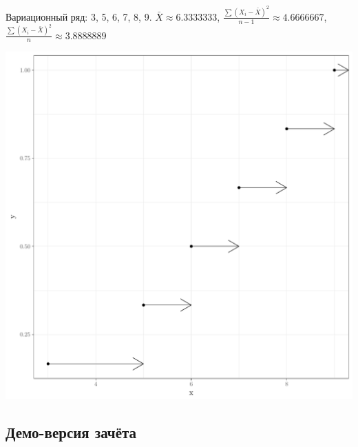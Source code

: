\documentclass[12pt, a4paper]{article}\usepackage[]{graphicx}\usepackage[]{color}
\begin{document}
\begin{enumerate}
Вариационный ряд: 3, 5, 6, 7, 8, 9. $\bar{X}\approx 6.3333333$,
$\frac{\sum (X_i-\bar{X})^2}{n-1}\approx 4.6666667$,
$\frac{\sum (X_i-\bar{X})^2}{n}\approx 3.8888889$

\begin{minipage}{0.6\textwidth}
\begin{center}
\includegraphics[scale=0.5]{auto_figures_tikz/2012_2013_fig_02_empirical_dist.pdf}
\end{center}
\end{minipage}


\end{enumerate}

\subsection{Демо-версия зачёта}
\end{document}
